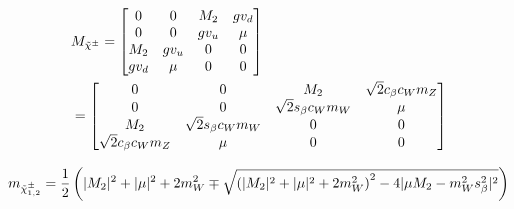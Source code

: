 \documentclass[a4paper,10pt]{article}
\begin{document}
        \begin{subequations}
            \begin{align}
                &M_{\chino} = \begin{bmatrix}
                    0 & 0 & M_2 & g v_d \\
                    0 & 0 & g v_u & \mu \\
                    M_2 & gv_u & 0 & 0 \\
                    gv_d & \mu & 0 & 0
                \end{bmatrix} \\
                &= \begin{bmatrix}
                    0 & 0 & M_2 & \sqrt{2} c_\beta c_W m_Z \\
                    0 & 0 & \sqrt{2} s_\beta c_W m_W & \mu \\
                    M_2 & \sqrt{2} s_\beta c_W m_W & 0 & 0 \\
                    \sqrt{2} c_\beta c_W m_Z & \mu & 0 & 0
                \end{bmatrix}
            \end{align}
        \end{subequations}

        \begin{align}
            m_{\chino[1,2]} = \frac{1}{2} \pclosed{ |M_2|^2 + |\mu|^2 + 2m_W^2 \mp \sqrt{\pclosed{|M_2|^2 + |\mu|^2 + 2m_W^2}^2 - 4|\mu M_2 - m_W^2 s_\beta^2|^2} }
        \end{align}
\end{document}
